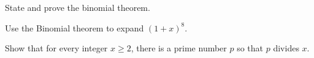 \documentclass[12pt]{midterm}
\begin{document}
\begin{exam}
\begin{problem}[360]
  State and prove the binomial theorem.
\end{problem}

\begin{solution}\begin{solutiontext}
\end{solutiontext}\end{solution}

\begin{problem}[360]
  Use the Binomial theorem to expand $(1+x)^{8}$.
\end{problem}

\begin{solution}\begin{solutiontext}
\end{solutiontext}\end{solution}

\begin{problem}[360]
  Show that for every integer $x \geq 2$, there is a prime number $p$
  so that $p$ divides $x$.
\end{problem}




\end{exam}
\end{document}
